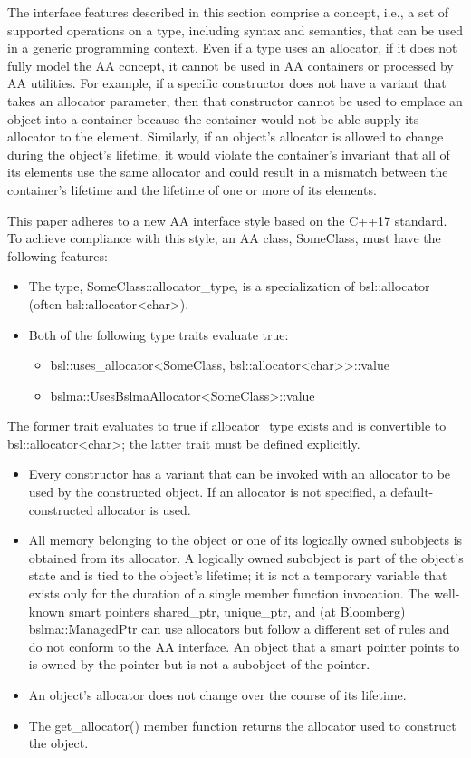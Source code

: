 The interface features described in this section comprise a concept, i.e., a
set of supported operations on a type, including syntax and semantics, that
can be used in a generic programming context. Even if a type uses an allocator,
if it does not fully model the AA concept, it cannot be used in AA containers
or processed by AA utilities. For example, if a specific constructor does not
have a variant that takes an allocator parameter, then that constructor cannot
be used to emplace an object into a container because the container would not
be able supply its allocator to the element. Similarly, if an object’s
allocator is allowed to change during the object’s lifetime, it would violate
the container’s invariant that all of its elements use the same allocator and
could result in a mismatch between the container’s lifetime and the lifetime
of one or more of its elements.

This paper adheres to a new AA interface style based on the C++17 standard.
To achieve compliance with this style, an AA class, SomeClass, must have the
following features:
\begin{itemize}
\item The type, SomeClass::allocator_type, is a specialization of
  bsl::allocator (often bsl::allocator<char>).
\item Both of the following type traits evaluate true:
  \begin{itemize}
  \item bsl::uses_allocator<SomeClass, bsl::allocator<char>>::value
  \item bslma::UsesBslmaAllocator<SomeClass>::value
  \end{itemize}
\end{itemize}

The former trait evaluates to true if allocator_type exists and is convertible
to bsl::allocator<char>; the latter trait must be defined explicitly.
\begin{itemize}
\item Every constructor has a variant that can be invoked with an allocator to be used by the constructed object.  If an allocator is not specified, a default-constructed allocator is used.
\item All memory belonging to the object or one of its logically owned subobjects is obtained from its allocator. A logically owned subobject is part of the object’s state and is tied to the object’s lifetime; it is not a temporary variable that exists only for the duration of a single member function invocation.  The well-known smart pointers shared_ptr, unique_ptr, and (at Bloomberg) bslma::ManagedPtr can use allocators but follow a different set of rules and do not conform to the AA interface. An object that a smart pointer points to is owned by the pointer but is not a subobject of the pointer.
\item An object’s allocator does not change over the course of its lifetime.
\item The get_allocator() member function returns the allocator used to construct the object.
\end{itemize}



